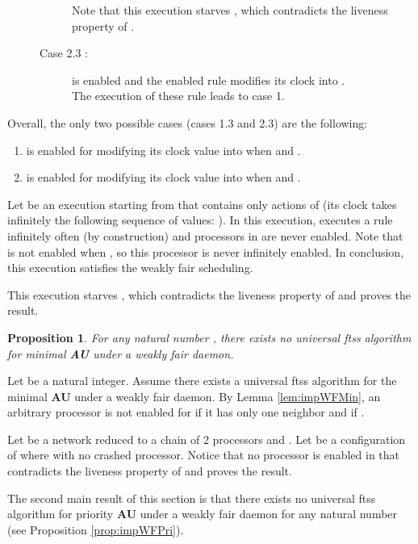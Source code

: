 \documentclass[11pt,english,letterpaper]{article}
\newtheorem{proposition}{Proposition}
\newenvironment{proof}{{\noindent\bf Proof. } }{{\hfill }}
\begin{document}
\begin{proof}
\begin{description}
\begin{description}
Note that this execution starves , which contradicts the liveness property of . 
\item[Case 2.3 :]  is enabled and the enabled rule modifies its clock into .\\
The execution of these rule leads to case 1.

\end{description}
\end{description}

Overall, the only two possible cases (cases 1.3 and 2.3) are the following: 

\begin{enumerate} 
\item  is enabled for modifying its clock value into  when  and .
\item   is enabled for modifying its clock value into   when  and . 
\end{enumerate}

Let  be an execution starting from  that contains only actions of  (its clock takes infinitely the following sequence of values: ). In this execution,  executes a rule infinitely often (by construction) and processors in  are never enabled. Note that  is not enabled when , so this processor is never infinitely enabled. In conclusion, this execution satisfies the weakly fair scheduling. 

This execution starves , which contradicts the liveness property of  and proves the result.
\end{proof}

\begin{proposition}\label{prop:impWFMin}
For any natural number , there exists no universal ftss algorithm for \emph{minimal} \textbf{AU} under a weakly fair daemon.
\end{proposition}

\begin{proof}
Let  be a natural integer. Assume there exists a universal ftss algorithm  for the minimal \textbf{AU} under a weakly fair daemon. By Lemma \ref{lem:impWFMin}, an arbitrary processor  is not enabled for  if it has only one neighbor  and if .

Let  be a network reduced to a chain of 2 processors  and . Let  be a configuration of  where  with no crashed processor. Notice that no processor is enabled in  that contradicts the liveness property of  and proves the result.
\end{proof}

The second main result of this section is that there exists no universal ftss algorithm for priority \textbf{AU} under a weakly fair daemon for any natural number  (see Proposition \ref{prop:impWFPri}).
\end{document}
